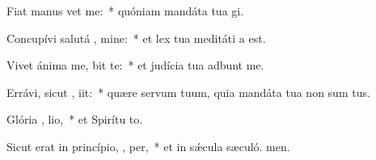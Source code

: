 \item Fiat manus   vet me:~* quóniam mandáta tua gi.
\item Concupívi salutá , mine:~* et lex tua meditáti a est.
\item Vivet ánima me,  bit te:~* et judícia tua adbunt me.
\item Errávi, sicut ,  iit:~* quære servum tuum, quia mandáta tua non sum tus.
\item Glória ,  lio,~* et Spirítu to.
\item Sicut erat in princípio,  ,  per,~* et in sǽcula sæculó. men.
